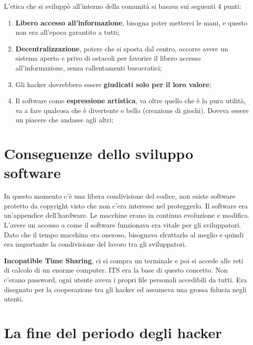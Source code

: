 L'etica che si sviluppò all'interno della comunità si basava sui seguenti 4 punti:

\begin{enumerate}

\item \textbf{Libero accesso all'informazione}, bisogna poter metterci le mani, e questo non era all'epoca garantito a tutti;
\item \textbf{Decentralizzazione}, potere che si sposta dal centro, occorre avere un sistema aperto e privo di ostacoli per favorire il libero accesso all'informazione, senza rallentamenti burocratici;
\item Gli hacker dovrebbero essere \textbf{giudicati solo per il loro valore};
\item Il software come \textbf{espressione artistica}, va oltre quello che è la pura utilità, va a fare qualcosa che è divertente e bello (creazione di giochi). Doveva essere un piacere che andasse agli altri;

\end{enumerate}

\section{Conseguenze dello sviluppo software}

In questo momento c'è una libera condivisione del codice, non esiste software protetto da copyright visto che non c'era interesse nel proteggerlo. Il software era un'appendice dell'hardware. Le macchine erano in continua evoluzione e modifica. L'avere un accesso a come il software funzionava era vitale per gli sviluppatori. Dato che il tempo macchina era oneroso, bisognava sfruttarlo al meglio e quindi era importante la condivisione del lavoro tra gli sviluppatori.

\textbf{Incopatible Time Sharing}, ci si compra un terminale e poi si accede alle reti di calcolo di un enorme computer. ITS era la base di questo concetto. Non c'erano password, ogni utente aveva i propri file personali accedibili da tutti. Era disegnato per la cooperazione tra gli hacker ed assumeva una grossa fiducia negli utenti.

\section{La fine del periodo degli hacker}

